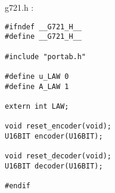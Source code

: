g721.h :

\begin{verbatim}
#ifndef __G721_H__
#define __G721_H__

#include "portab.h"

#define u_LAW 0
#define A_LAW 1

extern int LAW;

void reset_encoder(void);
U16BIT encoder(U16BIT);

void reset_decoder(void);
U16BIT decoder(U16BIT);

#endif
\end{verbatim}
